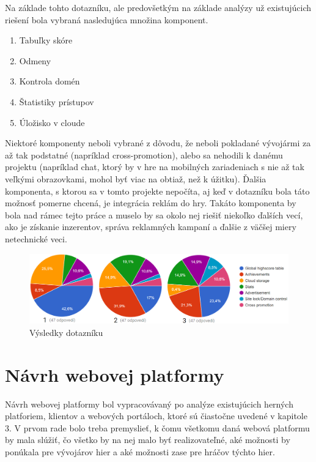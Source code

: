 Na základe tohto dotazníku, ale predovšetkým na základe analýzy už existujúcich riešení bola vybraná nasledujúca množina komponent.
\begin{enumerate}
\item Tabuľky skóre
\item Odmeny
\item Kontrola domén
\item Štatistiky prístupov
\item Úložisko v cloude
\end{enumerate}
Niektoré komponenty neboli vybrané z dôvodu, že neboli pokladané vývojármi za až tak podstatné (napríklad cross-promotion), alebo sa nehodili k danému projektu (napríklad chat, ktorý by v hre na mobilných zariadeniach s nie až tak veľkými obrazovkami, mohol byť viac na obtiaž, než k úžitku). Ďalšia komponenta, s ktorou sa v tomto projekte nepočíta, aj keď v dotazníku bola táto možnosť pomerne chcená, je integrácia reklám do hry. Takáto komponenta by bola nad rámec tejto práce a muselo by sa okolo nej riešiť niekoľko ďalších vecí, ako je získanie inzerentov, správa reklamných kampaní a ďalšie z väčšej miery netechnické veci.
\begin{figure}[h]
  \centering
  \includegraphics[scale=0.4]{fig/graf-dotazniku.png}
  \caption{Výsledky dotazníku}
  \label{fig:dotaznik}
\end{figure}

\section{Návrh webovej platformy}
Návrh webovej platformy bol vypracovávaný po analýze existujúcich herných platforiem, klientov a webových portáloch, ktoré sú čiastočne uvedené v kapitole 3. V prvom rade bolo treba premyslieť, k čomu všetkomu daná webová platformu by mala slúžiť, čo všetko by na nej malo byť realizovateľné, aké možnosti by ponúkala pre vývojárov hier a aké možnosti zase pre hráčov týchto hier. 

